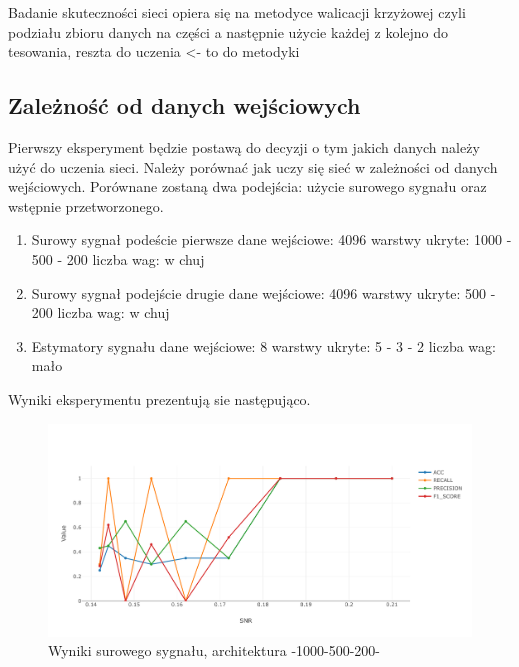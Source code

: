 \documentclass[12pt, a4paper, oneside]{article}
\begin{document}
	Badanie skuteczności sieci opiera się na metodyce walicacji krzyżowej czyli podziału zbioru danych na części a następnie użycie każdej z kolejno do tesowania, reszta do uczenia <- to do metodyki
	

	\subsection{Zależność od danych wejściowych}
	Pierwszy eksperyment będzie postawą do decyzji o tym jakich danych należy użyć do uczenia sieci. Należy porównać jak uczy się sieć w zależności od danych wejściowych. Porównane zostaną dwa podejścia: użycie surowego sygnału oraz wstępnie przetworzonego. 
	
	\begin{enumerate}
		\item Surowy sygnał podeście pierwsze
			\subitem dane wejściowe: 4096
			\subitem warstwy ukryte: 1000 - 500 - 200
			\subitem liczba wag: w chuj
		
		\item Surowy sygnał podejście drugie
			\subitem dane wejściowe: 4096
			\subitem warstwy ukryte: 500 - 200
			\subitem liczba wag: w chuj
			
		\item Estymatory sygnału
			\subitem dane wejściowe: 8
			\subitem warstwy ukryte: 5 - 3 - 2
			\subitem liczba wag: mało
	\end{enumerate}
	
	Wyniki eksperymentu prezentują sie następująco.
	

	\begin{figure}[H]
		\includegraphics[width=16cm]{images/nn_full_1000_500_200.pdf}
		\caption{Wyniki surowego sygnału, architektura -1000-500-200-}
	\end{figure}
\end{document}
